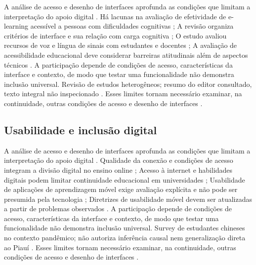A análise de acesso e desenho de interfaces aprofunda as condições que limitam a interpretação do apoio digital \citep{cinquin2019} \citep{cob2023} \citep{farhan2020} \citep{gobbo2023}. Há lacunas na avaliação de efetividade de e-learning acessível a pessoas com dificuldades cognitivas \citep{cinquin2019}; A revisão organiza critérios de interface e sua relação com carga cognitiva \citep{cob2023}; O estudo avaliou recursos de voz e língua de sinais com estudantes e docentes \citep{farhan2020}; A avaliação de acessibilidade educacional deve considerar barreiras atitudinais além de aspectos técnicos \citep{gobbo2023}. A participação depende de condições de acesso, características da interface e contexto, de modo que testar uma funcionalidade não demonstra inclusão universal. Revisão de estudos heterogêneos; resumo do editor consultado, texto integral não inspecionado \citep{cinquin2019} \citep{cob2023} \citep{farhan2020} \citep{gobbo2023}. Esses limites tornam necessário examinar, na continuidade, outras condições de acesso e desenho de interfaces \citep{cinquin2019} \citep{cob2023} \citep{farhan2020} \citep{gobbo2023}.

\clearpage\subsection*{Usabilidade e inclusão digital}

A análise de acesso e desenho de interfaces aprofunda as condições que limitam a interpretação do apoio digital \citep{guo2022} \citep{jamil2023} \citep{kumar2017} \citep{kumarguideline2019}. Qualidade da conexão e condições de acesso integram a divisão digital no ensino online \citep{guo2022}; Acesso à internet e habilidades digitais podem limitar continuidade educacional em universidades \citep{jamil2023}; Usabilidade de aplicações de aprendizagem móvel exige avaliação explícita e não pode ser presumida pela tecnologia \citep{kumar2017}; Diretrizes de usabilidade móvel devem ser atualizadas a partir de problemas observados \citep{kumarguideline2019}. A participação depende de condições de acesso, características da interface e contexto, de modo que testar uma funcionalidade não demonstra inclusão universal. Survey de estudantes chineses no contexto pandêmico; não autoriza inferência causal nem generalização direta ao Piauí \citep{guo2022} \citep{jamil2023} \citep{kumar2017} \citep{kumarguideline2019}. Esses limites tornam necessário examinar, na continuidade, outras condições de acesso e desenho de interfaces \citep{guo2022} \citep{jamil2023} \citep{kumar2017} \citep{kumarguideline2019}.

